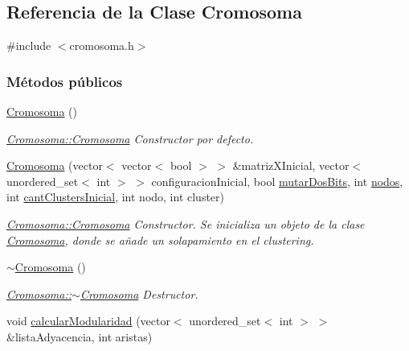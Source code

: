 \hypertarget{class_cromosoma}{\subsection{Referencia de la Clase Cromosoma}
\label{class_cromosoma}
}


{\ttfamily \#include $<$cromosoma.\-h$>$}

\subsubsection*{Métodos públicos}
\begin{DoxyCompactItemize}
\item 
\hyperlink{class_cromosoma_a8367f3dd60c6af083aed533c69f17b29}{Cromosoma} ()
\begin{DoxyCompactList}\small\item\em \hyperlink{class_cromosoma_a8367f3dd60c6af083aed533c69f17b29}{Cromosoma\-::\-Cromosoma} Constructor por defecto. \end{DoxyCompactList}\item 
\hyperlink{class_cromosoma_a73005200af7dfe43ba95b53d59530aef}{Cromosoma} (vector$<$ vector$<$ bool $>$ $>$ \&matriz\-X\-Inicial, vector$<$ unordered\-\_\-set$<$ int $>$ $>$ configuracion\-Inicial, bool \hyperlink{class_cromosoma_a4fca54673dbf02d203ba8e106233e333}{mutar\-Dos\-Bits}, int \hyperlink{class_cromosoma_a02471be3a2fd834be973bae8c2db42ac}{nodos}, int \hyperlink{class_cromosoma_a3b705a43d31136065740f0e01ee6af0b}{cant\-Clusters\-Inicial}, int nodo, int cluster)
\begin{DoxyCompactList}\small\item\em \hyperlink{class_cromosoma_a8367f3dd60c6af083aed533c69f17b29}{Cromosoma\-::\-Cromosoma} Constructor. Se inicializa un objeto de la clase \hyperlink{class_cromosoma}{Cromosoma}, donde se añade un solapamiento en el {\itshape clustering}. \end{DoxyCompactList}\item 
\hyperlink{class_cromosoma_a39310d043c187768ba83a1a9c921e966}{$\sim$\-Cromosoma} ()
\begin{DoxyCompactList}\small\item\em \hyperlink{class_cromosoma_a39310d043c187768ba83a1a9c921e966}{Cromosoma\-::$\sim$\-Cromosoma} Destructor. \end{DoxyCompactList}\item 
void \hyperlink{class_cromosoma_ac331434df88dfd7cdebee472381ff106}{calcular\-Modularidad} (vector$<$ unordered\-\_\-set$<$ int $>$ $>$ \&lista\-Adyacencia, int aristas)

\end{DoxyCompactItemize}
